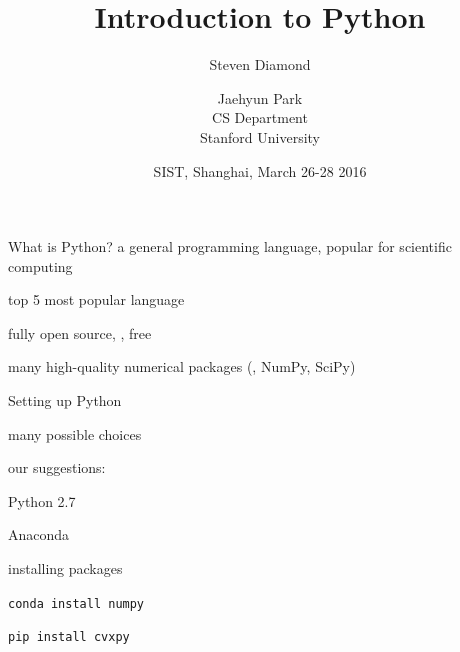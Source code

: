 \documentclass[10pt,mathserif]{beamer}
\title{\large \bfseries Introduction to Python}
\author{Steven Diamond \and Jaehyun Park \\[1ex]
CS Department\\[1ex]
Stanford University}
\date{SIST, Shanghai, March 26-28 2016}
\begin{document}
\frame{
\thispagestyle{empty}
\titlepage
}

\begin{frame}{What is Python?}
a general programming language, popular for scientific computing

\BIT
\item top 5 most popular language
\item fully open source, \ie, free
\item many high-quality numerical packages (\eg, NumPy, SciPy)
\EIT
\end{frame}

\begin{frame}{Setting up Python}
\BIT
\item many possible choices
\item our suggestions:
\BIT
\item Python 2.7
\item Anaconda
\EIT
\item installing packages
\BIT
\item \texttt{conda install numpy}
\item \texttt{pip install cvxpy}
\EIT
\EIT
\end{frame}
\end{document}
